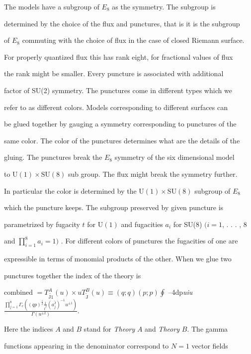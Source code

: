 \documentclass[a4paper,12pt]{article}
\begin{document}
The models have a subgroup of $E_{8}$ as the symmetry. The subgroup is

determined by the choice of the flux and punctures, that is it is the subgroup

of $E_{8}$ commuting with the choice of flux in the case of closed Riemann surface.

For properly quantized flux this has rank eight, for fractional values of flux

the rank might be smaller. Every puncture is associated with additional

factor of SU(2) symmetry. The punctures come in different types which we

refer to as different colors. Models corresponding to different surfaces can

be glued together by gauging a symmetry corresponding to punctures of the

same color. The color of the punctures determines what are the details of the

gluing. The punctures break the $E_{8}$ symmetry of the six dimensional model

to $\mathrm{U}(1) \times \mathrm{S}\mathrm{U}(8)$ sub group. The flux might break the symmetry further.

In particular the color is determined by the $\mathrm{U}(1) \times \mathrm{S}\mathrm{U}(8)$ subgroup of $E_{8}$

which the puncture keeps. The subgroup preserved by given puncture is

parametrized by fugacity $t$ for $\mathrm{U}(1)$ and fugacities $a_{i}$ for SU(8) $(i=1$, . . . , 8

and $\displaystyle \prod_{i=1}^{8}a_{i} = 1)$ . For different colors of punctures the fugacities of one are

expressible in terms of monomial products of the other. When we glue two

punctures together the index of the theory is

combined $=T_{\tilde{\mathrm{J}1}}^{A}(u) \displaystyle \times uT_{\tilde{\mathrm{J}}}^{B}(u)\equiv(q;q)(p;p)\oint$ --4dp{\it uiu} $\displaystyle \frac{\prod_{j=1}^{8}\Gamma_{e}((qp)^{\frac{1}{2}}\frac{1}{t^{\overline{\mathrm{J}}}}(a_{j}^{\tilde{\mathrm{J}}})^{-1}u^{\pm 1})}{\Gamma(u^{\pm 2})}.$

Here the indices $A$ and $B$ stand for {\it Theory} $A$ and {\it Theory} $B$. The gamma

functions appearing in the denominator correspond to $N= 1$ vector fields
\end{document}

